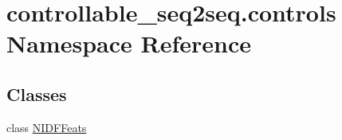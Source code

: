 \hypertarget{namespacecontrollable__seq2seq_1_1controls}{}\section{controllable\+\_\+seq2seq.\+controls Namespace Reference}
\label{namespacecontrollable__seq2seq_1_1controls}
\subsection*{Classes}
\begin{DoxyCompactItemize}
\item 
class \hyperlink{classcontrollable__seq2seq_1_1controls_1_1NIDFFeats}{N\+I\+D\+F\+Feats}
\end{DoxyCompactItemize}
